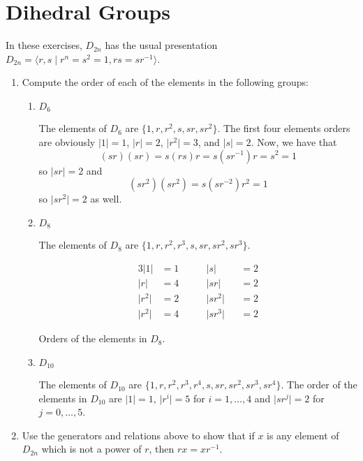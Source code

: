 \section{Dihedral Groups}
In these exercises, \(D_{2n}\) has the usual presentation
\(D_{2n} = \langle r,s\mid r^n = s^2 = 1, rs = sr^{-1}\rangle\).
\begin{enumerate}
\item
  Compute the order of each of the elements in the following groups:
  \begin{enumerate}[label = (\alph*)]
  \item
    \(D_6\)
    \par\smallskip
    The elements of \(D_6\) are \(\{1,r,r^2,s,sr,sr^2\}\).
    The first four elements orders are obviously \(\lvert 1\rvert = 1\),
    \(\lvert r\rvert = 2\), \(\lvert r^2\rvert = 3\), and
    \(\lvert s\rvert = 2\).
    Now, we have that
    \[
    (sr)(sr) = s(rs)r = s(sr^{-1})r = s^2 = 1
    \]
    so \(\lvert sr\rvert = 2\) and
    \[
    (sr^2)(sr^2) = s(sr^{-2})r^2 = 1
    \]
    so \(\lvert sr^2\rvert = 2\) as well.
  \item
    \(D_8\)
    \par\smallskip
    The elements of \(D_8\) are \(\{1,r,r^2,r^3,s,sr,sr^2,sr^3\}\).
    \begin{table}[H]
      \begin{alignat*}{3}
        \lvert 1\rvert & = 1 & \qquad \lvert s\rvert &&{}= 2\\
        \lvert r\rvert & = 4 & \qquad \lvert sr\rvert &&{}= 2\\
        \lvert r^2\rvert & = 2 & \qquad \lvert sr^2\rvert &&{}= 2\\
        \lvert r^2\rvert & = 4 & \qquad \lvert sr^3\rvert &&{}= 2
      \end{alignat*}
      \vspace{-0.75cm}
      \caption{Orders of the elements in \(D_8\).}
    \end{table}
  \item
    \(D_{10}\)
    \par\smallskip
    The elements of \(D_{10}\) are \(\{1,r,r^2,r^3,r^4,s,sr,sr^2,sr^3,sr^4\}\).
    The order of the elements in \(D_{10}\) are \(\lvert 1\rvert = 1\),
    \(\lvert r^i\rvert = 5\) for \(i = 1,\ldots,4\) and
    \(\lvert sr^j\rvert = 2\) for \(j = 0,\ldots,5\).
  \end{enumerate}
\item
  Use the generators and relations above to show that if \(x\) is any element
  of \(D_{2n}\) which is not a power of \(r\), then \(rx = xr^{-1}\).

\end{enumerate}
